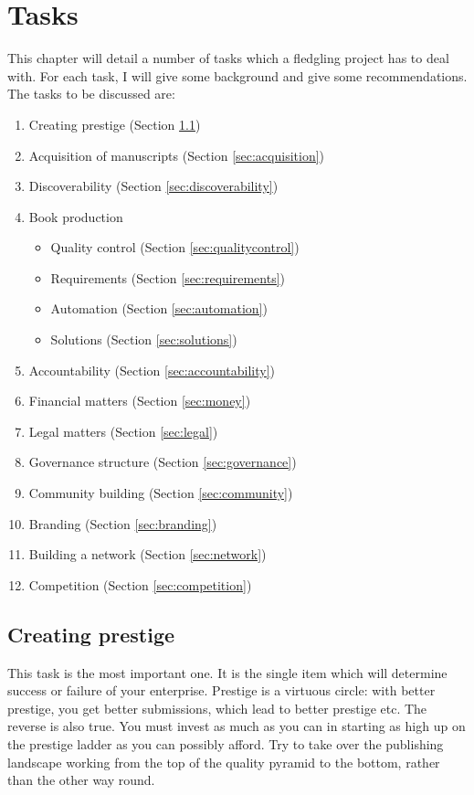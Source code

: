 \documentclass[guidelines,nonflat,modfonts] {langsci/langscibook}
\begin{document}
\chapter{Tasks}
This chapter will detail a number of tasks which a fledgling project has to deal with. For each task, I will give some background and give some recommendations. The tasks to be discussed are:

\begin{enumerate}
 \item Creating prestige (Section \ref{sec:prestige})
 \item Acquisition of manuscripts (Section \ref{sec:acquisition})
 \item Discoverability (Section \ref{sec:discoverability})
 \item Book production 
 \begin{itemize}
  \item Quality control (Section \ref{sec:qualitycontrol})
  \item Requirements (Section \ref{sec:requirements})
  \item Automation (Section \ref{sec:automation})
  \item Solutions (Section \ref{sec:solutions})
 \end{itemize}
 \item Accountability (Section \ref{sec:accountability})
 \item Financial matters (Section \ref{sec:money})
 \item Legal matters (Section \ref{sec:legal})
 \item Governance structure (Section \ref{sec:governance})
 \item Community building (Section \ref{sec:community})
 \item Branding (Section \ref{sec:branding})
 \item Building a network (Section \ref{sec:network})
 \item Competition (Section \ref{sec:competition})
\end{enumerate}


\section{Creating prestige}\label{sec:prestige}
This task is the most important one. It is the single item which will determine success or failure of your enterprise. 
Prestige is a virtuous circle: with better prestige, you get better submissions, which lead to better prestige etc. The reverse is also true. You must invest as much as you can in starting as high up on the prestige ladder as you can possibly afford. Try to take over the publishing landscape working from the top of the quality pyramid to the bottom, rather than the other way round.
\end{document}
